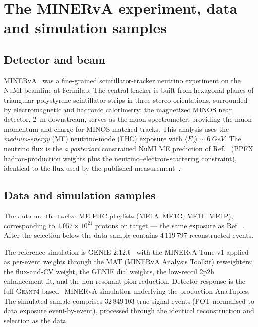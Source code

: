 \section{The MINERvA experiment, data and simulation samples}
\label{sec:experiment}

\subsection{Detector and beam}
MINERvA~\cite{MINERvA:2013zvz} was a fine-grained scintillator-tracker
neutrino experiment on the NuMI beamline at Fermilab. The central tracker is
built from hexagonal planes of triangular polystyrene scintillator strips in
three stereo orientations, surrounded by electromagnetic and hadronic
calorimetry; the magnetized MINOS near detector, \SI{2}{m} downstream, serves
as the muon spectrometer, providing the muon momentum and charge for
MINOS-matched tracks. This analysis uses the \emph{medium-energy} (ME)
neutrino-mode (FHC) exposure with $\langle E_\nu\rangle\sim\SI{6}{GeV}$. The
neutrino flux is the \emph{a posteriori} constrained NuMI ME prediction of
Ref.~\cite{MINERvA:2016iqn} (PPFX hadron-production weights plus the
neutrino--electron-scattering constraint), identical to the flux used by the
published measurement~\cite{MINERvA:2021owq}.

\subsection{Data and simulation samples}
The data are the twelve ME FHC playlists (ME1A--ME1G, ME1L--ME1P),
corresponding to $1.057\times10^{21}$ protons on target --- the same exposure
as Ref.~\cite{MINERvA:2021owq}. After the selection below the data sample
contains $4\,119\,797$ reconstructed events.

The reference simulation is GENIE 2.12.6~\cite{Andreopoulos:2009rq} with the
MINERvA Tune v1 applied as per-event weights through the MAT (MINERvA Analysis
Toolkit) reweighters: the flux-and-CV weight, the GENIE dial weights, the
low-recoil 2p2h enhancement fit, and the non-resonant-pion reduction. Detector
response is the full \textsc{Geant4}-based~\cite{GEANT4:2002zbu} MINERvA simulation underlying the
production AnaTuples. The simulated sample comprises $32\,849\,103$ true
signal events (POT-normalised to data exposure event-by-event), processed
through the identical reconstruction and selection as the data.

